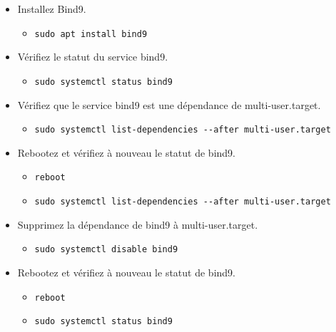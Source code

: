 \documentclass[a4paper]{article}
\begin{document}
\begin{itemize}

\item Installez Bind9.
\begin{example}
    \begin{itemize}
        \item \texttt{sudo apt install bind9}
    \end{itemize}
\end{example}

\item Vérifiez le statut du service bind9.
\begin{example}
    \begin{itemize}
        \item \texttt{sudo systemctl status bind9}
    \end{itemize}
\end{example}

\item Vérifiez que le service bind9 est une dépendance de multi-user.target.
\begin{example}
    \begin{itemize}
        \item \texttt{sudo systemctl list-dependencies -{}-after multi-user.target}
    \end{itemize}
\end{example}

\item Rebootez et vérifiez à nouveau le statut de bind9.
\begin{example}
    \begin{itemize}
        \item \texttt{reboot}
        \item \texttt{sudo systemctl list-dependencies -{}-after multi-user.target}
    \end{itemize}
\end{example}

\item Supprimez la dépendance de bind9 à multi-user.target.
\begin{example}
    \begin{itemize}
        \item \texttt{sudo systemctl disable bind9}
    \end{itemize}
\end{example}

\item Rebootez et vérifiez à nouveau le statut de bind9.
\begin{example}
    \begin{itemize}
        \item \texttt{reboot}
        \item \texttt{sudo systemctl status bind9}
    \end{itemize}
\end{example}


\end{itemize}
\end{document}
